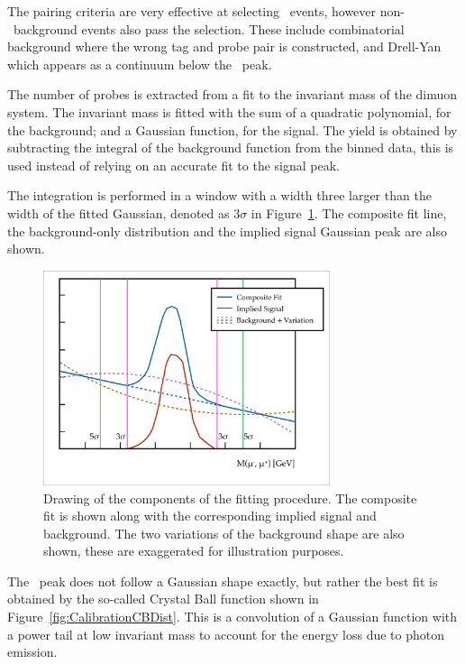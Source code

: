 The pairing criteria are very effective at selecting \jpsi\ events, however non-\jpsi\ background events also pass the selection. These include combinatorial background where the wrong tag and probe pair is constructed, and Drell-Yan which appears as a continuum below the \jpsi\ peak.

The number of probes is extracted from a fit to the invariant mass of the dimuon system. The invariant mass is fitted with the sum of a quadratic polynomial, for the background; and a Gaussian function, for the signal. The yield is obtained by subtracting the integral of the background function from the binned data, this is used instead of relying on an accurate fit to the signal peak.

The integration is performed in a window with a width three larger than the width of the fitted Gaussian, denoted as $3\sigma$ in Figure~\ref{fig:CalibrationFittingExample}. The composite fit line, the background-only distribution and the implied signal Gaussian peak are also shown.

\begin{figure}[htbp]
  \centering
    \includegraphics[width=0.75\textwidth]{PartCalibration2012/Plots/FittingExample.pdf}
    \caption[Drawing of the components of the fitting procedure.]{Drawing of the components of the fitting procedure. The composite fit is shown along with the corresponding implied signal and background. The two variations of the background shape are also shown, these are exaggerated for illustration purposes.}\label{fig:CalibrationFittingExample}
\end{figure}

The \jpsi\ peak does not follow a Gaussian shape exactly, but rather the best fit is obtained by the so-called Crystal Ball function shown in Figure~\ref{fig:CalibrationCBDist}. This is a convolution of a Gaussian function with a power tail at low invariant mass to account for the energy loss due to photon emission.

